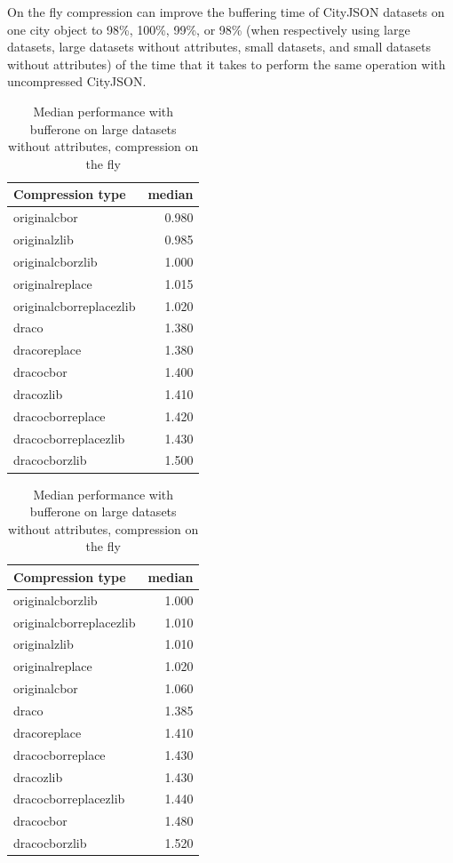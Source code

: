 On the fly compression can improve the buffering time of CityJSON datasets on one city object to 98\%, 100\%, 99\%, or 98\% (when respectively using large datasets, large datasets without attributes, small datasets, and small datasets without attributes) of the time that it takes to perform the same operation with uncompressed CityJSON.


  \begin{table}[!h]
    \begin{minipage}{.5\linewidth}
      \caption{
Median performance with bufferone on large datasets, compression on the fly}
\centering

\begin{tabular}{|l|r|}
\hline
Compression type & median\\
\hline
originalcbor & 0.980\\
\hline
originalzlib & 0.985\\
\hline
originalcborzlib & 1.000\\
\hline
originalreplace & 1.015\\
\hline
originalcborreplacezlib & 1.020\\
\hline
draco & 1.380\\
\hline
dracoreplace & 1.380\\
\hline
dracocbor & 1.400\\
\hline
dracozlib & 1.410\\
\hline
dracocborreplace & 1.420\\
\hline
dracocborreplacezlib & 1.430\\
\hline
dracocborzlib & 1.500\\
\hline
\end{tabular}
\end{minipage}%
    \begin{minipage}{.5\linewidth}
      \centering
        \caption{
Median performance with bufferone on large datasets without attributes, compression on the fly}

\begin{tabular}{|l|r|}
\hline
Compression type & median\\
\hline
originalcborzlib & 1.000\\
\hline
originalcborreplacezlib & 1.010\\
\hline
originalzlib & 1.010\\
\hline
originalreplace & 1.020\\
\hline
originalcbor & 1.060\\
\hline
draco & 1.385\\
\hline
dracoreplace & 1.410\\
\hline
dracocborreplace & 1.430\\
\hline
dracozlib & 1.430\\
\hline
dracocborreplacezlib & 1.440\\
\hline
dracocbor & 1.480\\
\hline
dracocborzlib & 1.520\\
\hline
\end{tabular}
\end{minipage} 
\end{table}
